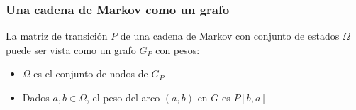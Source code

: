 \begin{frame}
\frametitle{Una cadena de Markov como un grafo}

{\small



La matriz de transición $P$ de una cadena de Markov con conjunto de estados $\Omega$ puede ser vista como un grafo $G_P$ con pesos:
\begin{itemize}
\item $\Omega$ es el conjunto de nodos de $G_P$


\item Dados $a, b \in \Omega$, el peso del arco $(a,b)$ en $G$ es $P[b,a]$
\end{itemize}

}

\end{frame}

